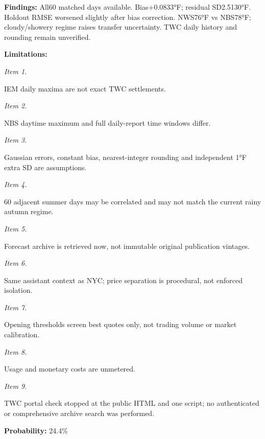 \documentclass[11pt]{article}
\begin{document}
\par\noindent\textbf{Findings:} All60 matched days available. Bias+0.0833°F; residual SD2.5130°F. Holdout RMSE worsened slightly after bias correction. NWS76°F vs NBS78°F; cloudy/showery regime raises transfer uncertainty. TWC daily history and rounding remain unverified.

\par\noindent\textbf{Limitations:} \par \par\noindent\textit{Item 1.}\par IEM daily maxima are not exact TWC settlements.

\par\noindent\textit{Item 2.}\par NBS daytime maximum and full daily-report time windows differ.

\par\noindent\textit{Item 3.}\par Gaussian errors, constant bias, nearest-integer rounding and independent 1°F extra SD are assumptions.

\par\noindent\textit{Item 4.}\par 60 adjacent summer days may be correlated and may not match the current rainy autumn regime.

\par\noindent\textit{Item 5.}\par Forecast archive is retrieved now, not immutable original publication vintages.

\par\noindent\textit{Item 6.}\par Same assistant context as NYC; price separation is procedural, not enforced isolation.

\par\noindent\textit{Item 7.}\par Opening thresholds screen best quotes only, not trading volume or market calibration.

\par\noindent\textit{Item 8.}\par Usage and monetary costs are unmetered.

\par\noindent\textit{Item 9.}\par TWC portal check stopped at the public HTML and one script; no authenticated or comprehensive archive search was performed.

\par\noindent\textbf{Probability:} 24.4\%
\end{document}
